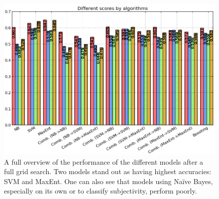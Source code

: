 \begin{figure}
 \begin{center}
     \includegraphics[width=\linewidth]{../img/plots/grid/full_biggersize.png}
 \end{center}
 \caption[Results overview across all models]{A full overview of the performance of the different models after a full grid search. Two models stand out as having highest accuracies: SVM and MaxEnt. One can also see that models using Na\"{i}ve Bayes, especially on its own or to classify subjectivity, perform poorly.}
 \label{fig:results_full}
\end{figure}

\clearpage

